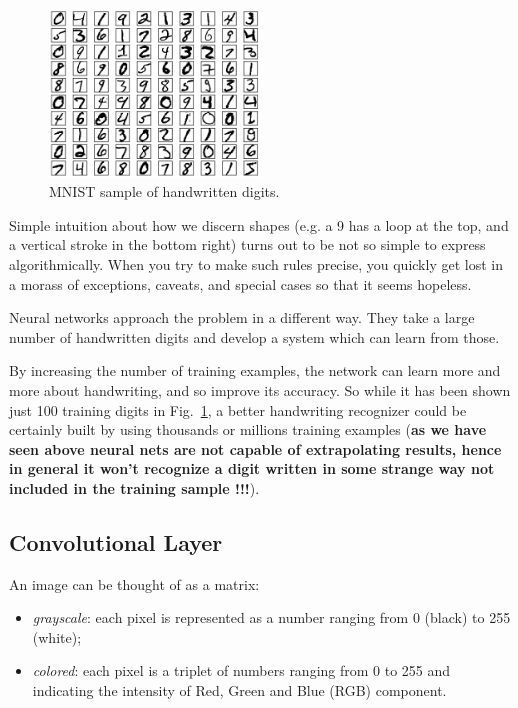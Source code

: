 \begin{figure}[b]
\centering
\includegraphics[width=0.5\textwidth]{figures/mnist_100_digits}
\caption{MNIST sample of handwritten digits.}
\label{fig:mnist}
\end{figure}

Simple intuition about how we discern shapes (e.g. a 9 has a loop at the top, and a vertical stroke in the bottom right) turns out to be not so simple to express algorithmically. When you try to make such rules precise, you quickly get lost in a morass of exceptions, caveats, and special cases so that it seems hopeless.

Neural networks approach the problem in a different way. They take a large number of handwritten digits and develop a system which can learn from those.

By increasing the number of training examples, the network can learn more and more about handwriting, and so improve its accuracy. So while it has been shown just 100 training digits in Fig.~\ref{fig:mnist}, a better handwriting recognizer could be certainly built by using thousands or millions training examples (\textbf{as we have seen above neural nets are not capable of extrapolating results, hence in general it won't recognize a digit written in some strange way not included in the training sample !!!}).

\subsection{Convolutional Layer}

An image can be thought of as a matrix:
\begin{itemize}
\item \emph{grayscale}: each pixel is represented as a number ranging from 0 (black) to 255 (white);
\item \emph{colored}: each pixel is a triplet of numbers ranging from 0 to 255 and indicating the intensity of Red, Green and Blue (RGB) component.
\end{itemize}

